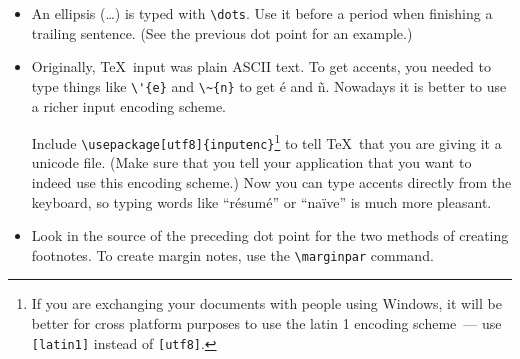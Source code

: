 \documentclass[article]{memoir}
\begin{document}
\begin{itemize}
\item	An ellipsis (\dots) is typed with \verb|\dots|. Use it before a period when finishing a trailing sentence. (See the previous dot point for an example.) 
	
\item	Originally, \TeX\ input was plain ASCII text. To get accents, you needed to type things like \verb|\'{e}| and \verb|\~{n}| to get \'e and \~n. Nowadays it is better to use a richer input encoding scheme.

Include \verb|\usepackage[utf8]{inputenc}|\footnote{If you are exchanging your documents with people using Windows, it will be better for cross platform purposes to use the latin 1 encoding scheme~--- use \texttt{[latin1]} instead of \texttt{[utf8]}.} to tell \TeX\ that you are giving it a unicode file. (Make sure that you tell your application that you want to indeed use this encoding scheme.\footnotemark) Now you can type accents directly from the keyboard, so typing words like ``résumé'' or ``naïve'' is much more pleasant.


\item	Look in the source of the preceding dot point for the two methods of creating footnotes.  To create margin notes, use the \verb|\marginpar| command.
\end{itemize}
\end{document}
